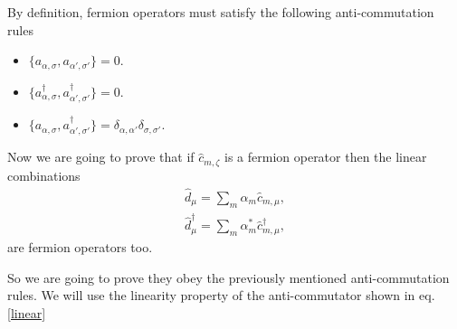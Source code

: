 \begin{questions}
\begin{solution}
  By definition, fermion operators must satisfy the following anti-commutation rules
  \begin{itemize}
    \item $\{a_{\alpha,\sigma},a_{\alpha',\sigma'}\} = 0.$
    \item $\{a^\dagger_{\alpha,\sigma},a^\dagger_{\alpha',\sigma'}\} = 0.$
    \item $\{a_{\alpha,\sigma},a^\dagger_{\alpha',\sigma'}\} = \delta_{\alpha, \alpha'}\delta_{\sigma,\sigma'}.$
  \end{itemize}
  Now we are going to prove that if $\hat{c}_{m,\zeta}$ is a fermion operator then the linear combinations
  \begin{eqnarray}
    \hat{d}_\mu = \sum_m \alpha_m\hat{c}_{m,\mu},\\
    \hat{d}^\dagger_\mu = \sum_m \alpha^*_m\hat{c}^\dagger_{m,\mu},
  \end{eqnarray}
  are fermion operators too.

  So we are going to prove they obey the previously mentioned anti-commutation rules. We will use the linearity property of the anti-commutator shown in eq. \ref{linear}


\end{solution}
\end{questions}
